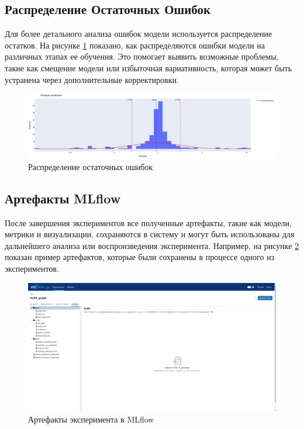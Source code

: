 \documentclass[14pt, a4paper]{bsu}
\begin{document}
\subsection{Распределение Остаточных Ошибок}

Для более детального анализа ошибок модели используется
распределение остатков. На рисунке \ref{fig:residuals_distribution}
показано, как распределяются ошибки модели на различных этапах ее
обучения. Это помогает выявить возможные проблемы, такие как
смещение модели или избыточная вариативность, которая может быть
устранена через дополнительные корректировки.

\begin{figure}[h!] \centering
	\includegraphics[width=1.0\textwidth]{residuals_distribution_example.png}
	\caption{Распределение остаточных ошибок}
	\label{fig:residuals_distribution} \end{figure}

\subsection{Артефакты MLflow}

После завершения экспериментов все полученные артефакты, такие как
модели, метрики и визуализации, сохраняются в систему и могут быть
использованы для дальнейшего анализа или воспроизведения
эксперимента. Например, на рисунке \ref{fig:mlflow_artifacts}
показан пример артефактов, которые были сохранены в процессе одного
из экспериментов.

\begin{figure}[h!] \centering
	\includegraphics[width=1.0\textwidth]{mlflow_artifacts_example.png}
	\caption{Артефакты эксперимента в MLflow}
	\label{fig:mlflow_artifacts} \end{figure}
\end{document}
